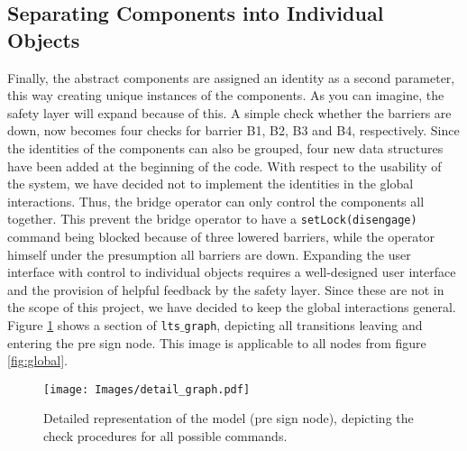 \subsection{Separating Components into Individual Objects}
\label{sec:ids}
Finally, the abstract components are assigned an  identity as a second parameter, this way creating unique instances of the components. As you can imagine, the safety layer will expand because of this. A simple check whether the barriers are down, now becomes four checks for barrier B1, B2, B3 and B4, respectively. Since the identities of the components can also be grouped, four new data structures have been added at the beginning of the code. With respect to the usability of the system, we have decided not to implement the identities in the global interactions. Thus, the bridge operator can only control the components all together. This prevent the bridge operator to have a \texttt{setLock(disengage)} command being blocked because of three lowered barriers, while the operator himself under the presumption all barriers are down. Expanding the user interface with control to individual objects requires a well-designed user interface and the provision of helpful feedback by the safety layer. Since these are not in the scope of this project, we have decided to keep the global interactions general. Figure \ref{fig:detailed} shows a section of \texttt{lts$\_$graph}, depicting all transitions leaving and entering the pre sign node. This image is applicable to all nodes from figure \ref{fig:global}.
%
\begin{figure}[htb]
\centering
\texttt{[image: Images/detail\_graph.pdf]}
\caption{Detailed representation of the model (pre sign node), depicting the check procedures for all possible commands.}%
\label{fig:detailed}
\end{figure}%
%

\newpage
